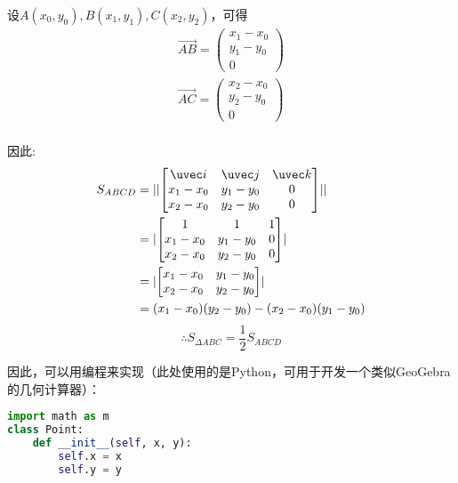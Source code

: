设$A(x_0, y_0), B(x_1, y_1), C(x_2, y_2)$，可得
\begin{equation}
\begin{aligned}
\vec{AB}=\begin{pmatrix}x_1-x_0 \\ y_1-y_0\\0\end{pmatrix}\\
\vec{AC}=\begin{pmatrix}x_2-x_0 \\ y_2-y_0\\0\end{pmatrix}\\
\end{aligned}
\end{equation}

因此:
\begin{equation}
\begin{aligned}
S_{ABCD}&=\lvert\lvert \begin{bmatrix}
\uvec i & \uvec j & \uvec k \\
x_1-x_0 & y_1-y_0 & 0\\
x_2-x_0 & y_2-y_0 & 0
\end{bmatrix}\rvert\rvert \\
&= \lvert \begin{bmatrix}
1 & 1 & 1 \\
x_1-x_0 & y_1-y_0 & 0\\
x_2-x_0 & y_2-y_0 & 0
\end{bmatrix}\rvert\\
&= \lvert \begin{bmatrix}
x_1-x_0 & y_1-y_0 \\
x_2-x_0 & y_2-y_0 
\end{bmatrix}\rvert \\
&=(x_1-x_0)(y_2-y_0)-(x_2-x_0)(y_1-y_0)
\end{aligned}
\end{equation}
$$\therefore S_{\Delta ABC}=\frac{1}{2} S_{ABCD}$$

因此，可以用编程来实现（此处使用的是Python，可用于开发一个类似GeoGebra的几何计算器）：
\begin{lstlisting}[language=python]
import math as m
class Point:
    def __init__(self, x, y):
        self.x = x
        self.y = y
\end{lstlisting}